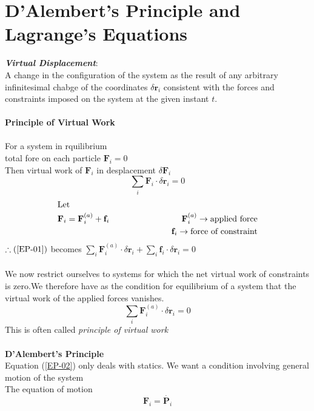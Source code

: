 \section{D'Alembert's Principle and Lagrange's Equations}
\textit{\textbf{Virtual Displacement}}:\\A change in the configuration of the system as the result of any arbitrary infinitesimal chabge of the coordinates $\delta \textbf{r}_i$ consistent with the forces and constraints imposed on the system at the given instant $t$.\\\\
\textbf{Principle of Virtual Work}\\\\
For a system in rquilibrium\\
total fore on each particle $\textbf{F}_i=0$\\
Then virtual work of $\textbf{F}_i$ in desplacement $\delta \textbf{F}_i$
\begin{equation}
\sum\limits_{i}\textbf{F}_i\cdot\delta \textbf{r}_i=0\label{EP-01}
\end{equation}
\begin{align*}
\intertext{Let}
\textbf{F}_i=\textbf{F}_i^{(a)}+\textbf{f}_i\hspace{3cm}\textbf{F}_i^{(a)}\rightarrow \text{applied force}\\
\textbf{f}_i\rightarrow \text{force of constraint}\\
\end{align*}
$\therefore (\ref{EP-01}) $ \quad becomes \quad $\sum_{i} \mathbf{F}_{i}^{(a)} \cdot \delta \mathbf{r}_{i}+\sum_{i} \mathbf{f}_{i} \cdot \delta \mathbf{r}_{i}=0$ \\\\
We now restrict ourselves to systems for which the net virtual work of constraints is zero.We therefore have as the condition for equilibrium of a system that the virtual work of the applied forces vanishes.
\begin{equation}
\sum_{i} \mathbf{F}_{i}^{(a)} \cdot \delta \mathbf{r}_{i}=0\label{EP-02}
\end{equation}
This is often called \textit{principle of virtual work}\\\\
\textbf{D'Alembert's Principle}\\
Equation (\ref{EP-02})  only deals with statics. We want a condition involving general motion of the system\\
The equation of motion 
$$\textbf{F}_i=\dot{\textbf{P}_i}$$
